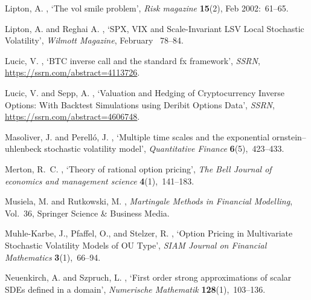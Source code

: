 \documentclass[11pt,a4paper] {article}
\begin{document}
\begin{thebibliography}{}
Lipton, A.  \harvardyearright , `The vol smile problem', {\em Risk magazine} {\bf 15}(2), Feb 2002:~61--65.


Lipton, A. and Reghai A.  \harvardyearright , `SPX, VIX and Scale-Invariant LSV Local Stochastic Volatility',
  {\em Wilmott Magazine}, February ~78--84.
	
Lucic, V.  \harvardyearright , `BTC inverse call and the
  standard fx framework', {\em SSRN}, \url{https://ssrn.com/abstract=4113726}.

Lucic, V. and Sepp, A. \harvardyearright , `Valuation and Hedging of Cryptocurrency Inverse Options: With Backtest Simulations using Deribit Options Data', {\em SSRN}, \url{https://ssrn.com/abstract=4606748}.
	
Masoliver, J. and Perell{\'o}, J.  \harvardyearright , `Multiple time scales and the exponential
  ornstein--uhlenbeck stochastic volatility model', {\em Quantitative Finance}
  {\bf 6}(5),~423--433.

Merton, R.~C.  \harvardyearright , `Theory of rational option pricing', {\em The Bell Journal of economics and management science} {\bf 4}(1),~141--183.

Musiela, M. and Rutkowski, M.  \harvardyearright
  , {\em Martingale Methods in Financial Modelling}, Vol.~36, Springer Science
  \& Business Media.
  
Muhle-Karbe, J., Pfaffel, O., and Stelzer, R. \harvardyearright , `Option Pricing in Multivariate Stochastic Volatility Models of OU Type', {\em SIAM Journal on Financial Mathematics} {\bf 3}(1),~66--94.
  
Neuenkirch, A. and Szpruch, L.  \harvardyearright
  , `First order strong approximations of scalar SDEs defined in a domain',
  {\em Numerische Mathematik} {\bf 128}(1),~103--136.
  


\end{thebibliography}
\end{document}
